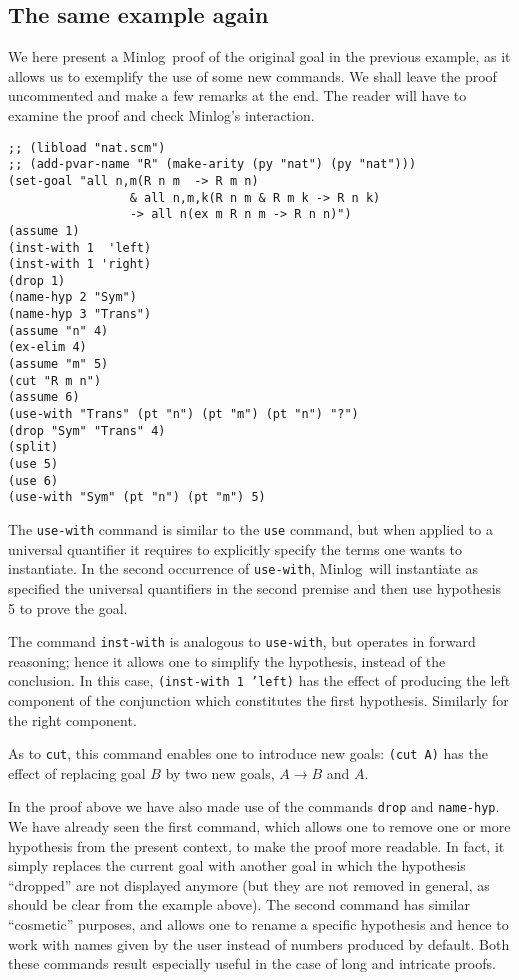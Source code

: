 \documentclass[12pt]{amsart}
\newcommand{\inquotes}[1]{``#1''}
\newcommand{\mi}{Minlog}
\newcommand{\ob}{\to}
\begin{document}
\subsection{The same example again}
We here present a \mi\ proof of the original goal in the previous
example, as it allows us to exemplify the use of some new commands.
We shall leave the proof uncommented and make a few remarks at the
end. The reader will have to examine the proof and check \mi's
interaction.
\begin{verbatim}
;; (libload "nat.scm")
;; (add-pvar-name "R" (make-arity (py "nat") (py "nat")))
(set-goal "all n,m(R n m  -> R m n)
                 & all n,m,k(R n m & R m k -> R n k)
                 -> all n(ex m R n m -> R n n)")
(assume 1)
(inst-with 1  'left)
(inst-with 1 'right)
(drop 1)
(name-hyp 2 "Sym")
(name-hyp 3 "Trans")
(assume "n" 4)
(ex-elim 4)
(assume "m" 5)
(cut "R m n")
(assume 6)
(use-with "Trans" (pt "n") (pt "m") (pt "n") "?")
(drop "Sym" "Trans" 4)
(split)
(use 5)
(use 6)
(use-with "Sym" (pt "n") (pt "m") 5)
\end{verbatim}

The \texttt{use-with} command is similar to the \texttt{use} command,
but when applied to a universal quantifier it requires to explicitly
specify the terms one wants to instantiate.  In the second occurrence
of \texttt{use-with}, \mi\ will instantiate as specified the universal
quantifiers in the second premise and then use hypothesis 5 to prove
the goal.

The command \texttt{inst-with} is analogous to \texttt{use-with}, but
operates in forward reasoning; hence it allows one to simplify the
hypothesis, instead of the conclusion. In this case,
\texttt{(inst-with 1 'left)} has the effect of producing the left
component of the conjunction which constitutes the first hypothesis.
Similarly for the right component.

As to \texttt{cut}, this command enables one to introduce new goals:
\texttt{(cut A)} has the effect of replacing goal $B$ by two new
goals, $A \ob B$ and $A$.

In the proof above we have also made use of the commands \texttt{drop}
and \texttt{name-hyp}.  We have already seen the first command, which
allows one to remove one or more hypothesis from the present context,
to make the proof more readable.  In fact, it simply replaces the
current goal with another goal in which the hypothesis
\inquotes{dropped} are not displayed anymore (but they are not removed
in general, as should be clear from the example above).  The second
command has similar \inquotes{cosmetic} purposes, and allows one to
rename a specific hypothesis and hence to work with names given by the
user instead of numbers produced by default.  Both these commands
result especially useful in the case of long and intricate proofs.
\end{document}
